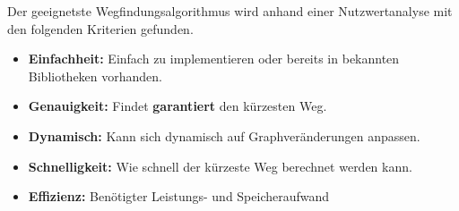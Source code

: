 \documentclass[../main.tex]{subfiles}
\begin{document}
Der geeignetste Wegfindungsalgorithmus wird anhand einer Nutzwertanalyse mit den folgenden Kriterien gefunden.

\begin{itemize}
    \item \textbf{Einfachheit:} Einfach zu implementieren oder bereits in bekannten Bibliotheken vorhanden.
    \item \textbf{Genauigkeit:} Findet \textbf{garantiert} den kürzesten Weg.
    \item \textbf{Dynamisch:} Kann sich dynamisch auf Graphveränderungen anpassen.
    \item \textbf{Schnelligkeit:} Wie schnell der kürzeste Weg berechnet werden kann.
    \item \textbf{Effizienz:} Benötigter Leistungs- und Speicheraufwand
\end{itemize}

\begin{table}[H]
    \caption{Nutzwertanalyse Wegfindung}
    \label{tab:nutzwertanalyse_wegfindung}
\end{table}
\end{document}
